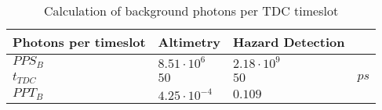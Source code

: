 \begin{table}[h]
\centering
\caption{Calculation of background photons per TDC timeslot}
\label{tab:PPT_B}
\begin{tabular}{|l|lll|} \hline
\textbf{Photons per timeslot} & \textbf{Altimetry} & \textbf{Hazard Detection} &      \\ \hline
$PPS_B$                       & $8.51\cdot10^6$    & $2.18\cdot10^9$           &      \\
$t_{TDC}$                     & $50$               & $50$                      & $ps$ \\
$PPT_B$                       & $4.25\cdot10^{-4}$ & $0.109$                   &      \\ \hline
\end{tabular}
\end{table}